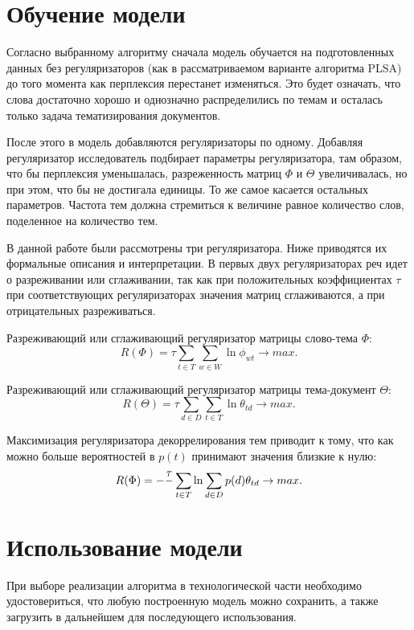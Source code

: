 %
\section{Обучение модели}

Согласно выбранному алгоритму сначала модель обучается на подготовленных данных без регуляризаторов (как в рассматриваемом варианте алгоритма PLSA) до того момента как перплексия перестанет изменяться. Это будет означать, что слова достаточно хорошо и однозначно распределились по темам и осталась только задача тематизирования документов.

После этого в модель добавляются регуляризаторы по одному. Добавляя регуляризатор исследователь подбирает параметры регуляризатора, там образом, что бы перплексия уменьшалась, разреженность матриц $\Phi$ и $\Theta$ увеличивалась, но при этом, что бы не достигала единицы. То же самое касается остальных параметров. Частота тем должна стремиться к величине равное количество слов, поделенное на количество тем.

В данной работе были рассмотрены три регуляризатора. Ниже приводятся их формальные описания и интерпретации. В первых двух регуляризаторах реч идет о разреживании или сглаживании, так как при положительных коэффициентах $\tau$ при соответствующих регуляризаторах значения матриц сглаживаются, а при отрицательных разреживаться.

Разреживающий или сглаживающий регуляризатор матрицы слово-тема $\Phi$:
$$
R(\Phi) = \tau \sum_{t \in T}{ \sum_{w \in W} \ln{ \phi_{wt} }} \rightarrow max.
$$

Разреживающий или сглаживающий регуляризатор матрицы тема-документ $\Theta$:
$$
R(\Theta) = \tau \sum_{d \in D}{ \sum_{t \in T} \ln{ \theta_{td} }} \rightarrow max.
$$

Максимизация регуляризатора декоррелирования тем приводит к тому, что как можно больше вероятностей в $p(t)$ принимают значения близкие к нулю:
$$
R(\Phi) = -{{\tau}\over{}} \sum_{t \in T}{ \ln{ \sum_{d \in D}{ p(d) \theta_{td} } } } \rightarrow max.
$$


%
\section{Использование модели}

При выборе реализации алгоритма в технологической части необходимо удостовериться, что любую построенную модель можно сохранить, а также загрузить в дальнейшем для последующего использования.


